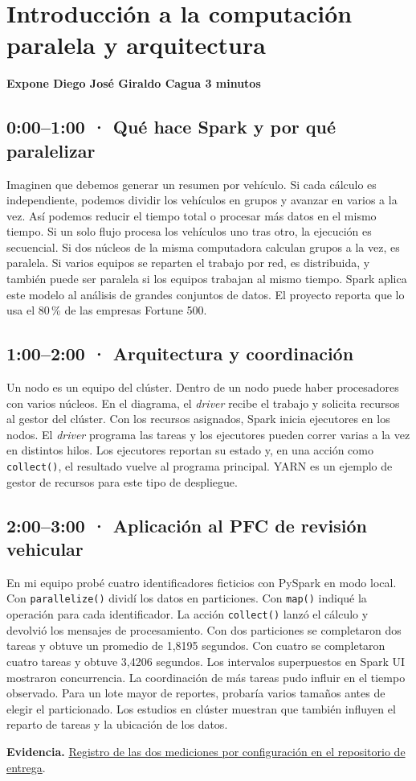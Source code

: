 \section*{Introducción a la computación paralela y arquitectura}
\textbf{Expone Diego José Giraldo Cagua \hfill 3 minutos}

\subsection*{0:00--1:00 · Qué hace Spark y por qué paralelizar}
Imaginen que debemos generar un resumen por vehículo. Si cada cálculo es independiente, podemos dividir los vehículos en grupos y avanzar en varios a la vez. Así podemos reducir el tiempo total o procesar más datos en el mismo tiempo. Si un solo flujo procesa los vehículos uno tras otro, la ejecución es secuencial. Si dos núcleos de la misma computadora calculan grupos a la vez, es paralela. Si varios equipos se reparten el trabajo por red, es distribuida, y también puede ser paralela si los equipos trabajan al mismo tiempo. Spark aplica este modelo al análisis de grandes conjuntos de datos. El proyecto reporta que lo usa el 80\,\% de las empresas Fortune 500. \cite{girTraff2026,girSparkHome}

\subsection*{1:00--2:00 · Arquitectura y coordinación}
Un nodo es un equipo del clúster. Dentro de un nodo puede haber procesadores con varios núcleos. En el diagrama, el \emph{driver} recibe el trabajo y solicita recursos al gestor del clúster. Con los recursos asignados, Spark inicia ejecutores en los nodos. El \emph{driver} programa las tareas y los ejecutores pueden correr varias a la vez en distintos hilos. Los ejecutores reportan su estado y, en una acción como \texttt{collect()}, el resultado vuelve al programa principal. YARN es un ejemplo de gestor de recursos para este tipo de despliegue. \cite{girSparkCluster,girSparkYarn,girSparkRdd}

\subsection*{2:00--3:00 · Aplicación al PFC de revisión vehicular}
En mi equipo probé cuatro identificadores ficticios con PySpark en modo local. Con \texttt{parallelize()} dividí los datos en particiones. Con \texttt{map()} indiqué la operación para cada identificador. La acción \texttt{collect()} lanzó el cálculo y devolvió los mensajes de procesamiento. Con dos particiones se completaron dos tareas y obtuve un promedio de 1,8195 segundos. Con cuatro se completaron cuatro tareas y obtuve 3,4206 segundos. Los intervalos superpuestos en Spark UI mostraron concurrencia. La coordinación de más tareas pudo influir en el tiempo observado. Para un lote mayor de reportes, probaría varios tamaños antes de elegir el particionado. Los estudios en clúster muestran que también influyen el reparto de tareas y la ubicación de los datos. \cite{girSparkPartitions,girSparkLocality}

\smallskip
\noindent\textbf{Evidencia.} \href{https://github.com/BryanLomb/GA-SUM-01-EXP-1-Exposicion-1er-Corte-Analisis-de-un-Sistema-Distribuido-Real/commit/b998007a13fb2a36c58156077c1bd705cc9a2854}{Registro de las dos mediciones por configuración en el repositorio de entrega}.
